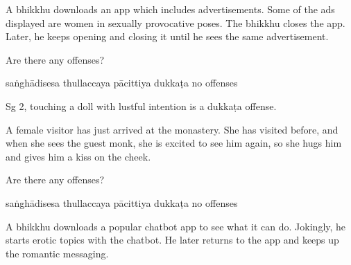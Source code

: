 \begin{exam}{\autoExamName}
\begin{problem}
\end{problem}

\problemDivide

\begin{problem}

  A bhikkhu downloads an app which includes advertisements. Some of the ads
  displayed are women in sexually provocative poses. The bhikkhu closes the app.
  Later, he keeps opening and closing it until he sees the same advertisement.

  Are there any offenses?

  \bigskip

  \begin{answers}{5}
    \bChoices
     saṅghādisesa\eAns
     thullaccaya\eAns
     pācittiya\eAns
     dukkaṭa\eAns
     no offenses\eAns
    \eChoices
  \end{answers}

  \begin{solution}
    Sg 2, touching a doll with lustful intention is a dukkaṭa offense.
  \end{solution}

\end{problem}

\problemDivide

\begin{problem}

  A female visitor has just arrived at the monastery.
  She has visited before, and when she sees the guest monk,
  she is excited to see him again,
  so she hugs him and gives him a kiss on the cheek.

  Are there any offenses?

  \bigskip

  \begin{answers}{5}
    \bChoices
     saṅghādisesa\eAns
     thullaccaya\eAns
     pācittiya\eAns
     dukkaṭa\eAns
     no offenses\eAns
    \eChoices
  \end{answers}

\end{problem}

\clearpage

\begin{problem*}

  A bhikkhu downloads a popular chatbot app to see what it can do. Jokingly, he starts
  erotic topics with the chatbot. He later returns to the app and keeps up the
  romantic messaging.

  \begin{parts}


\end{parts}
\end{problem*}
\end{exam}
